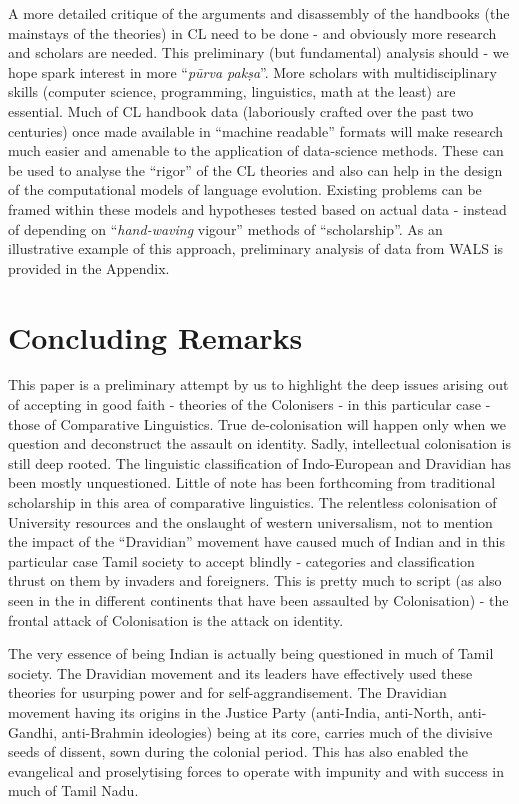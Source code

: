 A more detailed critique of the arguments and disassembly of the handbooks (the mainstays of the theories) in CL need to be done - and obviously more research and scholars are needed. This preliminary (but fundamental) analysis should - we hope spark interest in more “\textit{pūrva pakṣa}”. More scholars with multidisciplinary skills (computer science, programming, linguistics, math at the least) are essential. Much of CL handbook data (laboriously crafted over the past two centuries) once made available in “machine readable” formats will make research much easier and amenable to the application of data-science methods. These can be used to analyse the “rigor” of the CL theories and also can help in the design of the computational models of language evolution. Existing problems can be framed within these models and hypotheses tested based on actual data - instead of depending on “\textit{hand-waving} vigour” methods of “scholarship”. As an illustrative example of this approach, preliminary analysis of data from WALS is provided in the Appendix.


\section*{Concluding Remarks}

This paper is a preliminary attempt by us to highlight the deep issues arising out of accepting in good faith - theories of the Colonisers - in this particular case - those of Comparative Linguistics. True de-colonisation will happen only when we question and deconstruct the assault on identity. Sadly, intellectual colonisation is still deep rooted. The linguistic classification of Indo-European and Dravidian has been mostly unquestioned. Little of note has been forthcoming from traditional scholarship in this area of comparative linguistics. The relentless colonisation of University resources and the onslaught of western universalism, not to mention the impact of the “Dravidian” movement have caused much of Indian and in this particular case Tamil society to accept blindly - categories and classification thrust on them by invaders and foreigners. This is pretty much to script (as also seen in the in different continents that have been assaulted by Colonisation) - the frontal attack of Colonisation is the attack on identity.

The very essence of being Indian is actually being questioned in much of Tamil society. The Dravidian movement and its leaders have effectively used these theories for usurping power and for self-aggrandisement. The Dravidian movement having its origins in the Justice Party (anti-India, anti-North, anti-Gandhi, anti-Brahmin ideologies) being at its core, carries much of the divisive seeds of dissent, sown during the colonial period. This has also enabled the evangelical and proselytising forces to operate with impunity and with success in much of Tamil Nadu.

